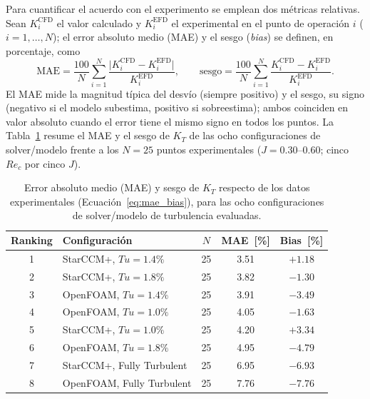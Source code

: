 Para cuantificar el acuerdo con el experimento se emplean dos métricas relativas.
Sean $K_i^{\mathrm{CFD}}$ el valor calculado y $K_i^{\mathrm{EFD}}$ el experimental en
el punto de operación $i$ ($i=1,\dots,N$); el error absoluto medio (MAE) y el sesgo
(\emph{bias}) se definen, en porcentaje, como
%
\begin{equation}
\mathrm{MAE} = \frac{100}{N}\sum_{i=1}^{N}
\frac{\bigl|K_i^{\mathrm{CFD}}-K_i^{\mathrm{EFD}}\bigr|}{K_i^{\mathrm{EFD}}},
\qquad
\mathrm{sesgo} = \frac{100}{N}\sum_{i=1}^{N}
\frac{K_i^{\mathrm{CFD}}-K_i^{\mathrm{EFD}}}{K_i^{\mathrm{EFD}}}.
\label{eq:mae_bias}
\end{equation}
%
El MAE mide la magnitud típica del desvío (siempre positivo) y el sesgo, su signo (negativo si el modelo subestima, positivo si sobreestima); ambos coinciden en valor
absoluto cuando el error tiene el mismo signo en todos los puntos. La
Tabla~\ref{tab:mae_global_coreana} resume el MAE y el sesgo de $K_T$ de las ocho
configuraciones de solver/modelo frente a los $N=25$ puntos experimentales
($J=0.30$--$0.60$; cinco $Re_c$ por cinco $J$).

\begin{table}[htpb]
\centering
\caption{Error absoluto medio (MAE) y sesgo de $K_T$ respecto de los datos
experimentales (Ecuación~\ref{eq:mae_bias}), para las ocho configuraciones de
solver/modelo de turbulencia evaluadas.}
\label{tab:mae_global_coreana}
\begin{tabular}{clccc}
\hline
Ranking & Configuración & $N$ & MAE~[\%] & Bias~[\%] \\
\hline
1 & StarCCM+, $Tu = 1.4\%$      & 25 & 3.51 & $+1.18$ \\
2 & StarCCM+, $Tu = 1.8\%$      & 25 & 3.82 & $-1.30$ \\
3 & OpenFOAM, $Tu = 1.4\%$      & 25 & 3.91 & $-3.49$ \\
4 & OpenFOAM, $Tu = 1.0\%$      & 25 & 4.05 & $-1.63$ \\
5 & StarCCM+, $Tu = 1.0\%$      & 25 & 4.20 & $+3.34$ \\
6 & OpenFOAM, $Tu = 1.8\%$      & 25 & 4.95 & $-4.79$ \\
7 & StarCCM+, Fully Turbulent   & 25 & 6.95 & $-6.93$ \\
8 & OpenFOAM, Fully Turbulent   & 25 & 7.76 & $-7.76$ \\
\hline
\end{tabular}
\end{table}

